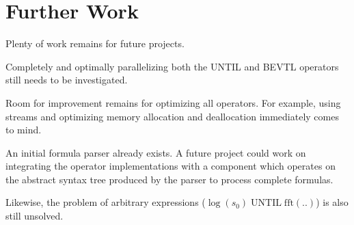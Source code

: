 \documentclass[a4paper,10pt]{article}
\begin{document}
\section{Further Work}

Plenty of work remains for future projects.

Completely and optimally parallelizing both the UNTIL and BEVTL operators still needs
to be investigated.

Room for improvement remains for optimizing all operators. For example, using streams
and optimizing memory allocation and deallocation immediately comes to mind.

An initial formula parser already exists. A future project could work on integrating the operator implementations with a component which operates on the abstract syntax tree produced by the parser to process complete formulas.

Likewise, the problem of arbitrary expressions ($\log(s_0) \; \text{UNTIL} \; \text{fft}(..)$) is also still unsolved.
\end{document}
